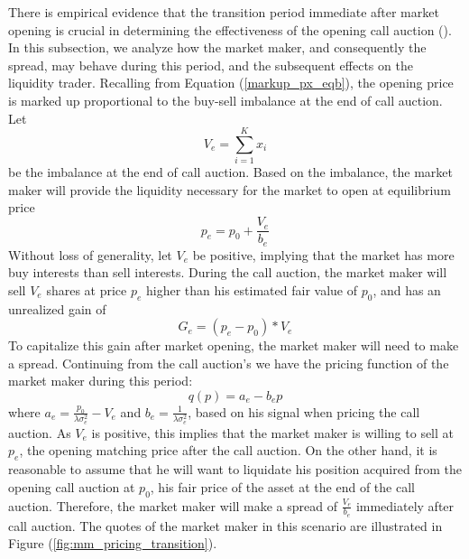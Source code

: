 There is empirical evidence that the transition period immediate after market opening is crucial in determining the effectiveness of the opening call auction (\cite{Pagano2013}). In this subsection, we analyze how the market maker, and consequently the spread, may behave during this period, and the subsequent effects on the liquidity trader. Recalling from Equation (\ref{markup_px_eqb}), the opening price is marked up proportional to the buy-sell imbalance at the end of call auction. Let
\[
  V_e = \sum_{i=1}^K x_i
\]
be the imbalance at the end of call auction. Based on the imbalance, the market maker will provide the liquidity necessary for the market to open at equilibrium price
\[
  p_e = p_0 + \frac{V_e}{b_e}
\]
Without loss of generality, let $V_e$ be positive, implying that the market has more buy interests than sell interests. During the call auction, the market maker will sell $V_e$ shares at price $p_e$ higher than his estimated fair value of $p_0$, and has an unrealized gain of
\[
  G_e = (p_e - p_0) * V_e
\]
To capitalize this gain after market opening, the market maker will need to make a spread. Continuing from the call auction's we have the pricing function of the market maker during this period:
\[
  q(p) = a_e - b_e p
\]
where $a_e = \frac{p_0}{\lambda \sigma_e^2} - V_e$ and $b_e=\frac{1}{\lambda \sigma_e^2}$, based on his signal when pricing the call auction. As $V_e$ is positive, this implies that the market maker is willing to sell at $p_e$, {\color{red} the opening matching price after the call auction}. On the other hand, it is reasonable to assume that he will want to liquidate his position acquired from the opening call auction at $p_0$, his fair price of the asset at the end of the call auction. Therefore, the market maker will make a spread of $\frac{V_e}{b_e}$ immediately after call auction. The quotes of the market maker {\color{red} in this scenario} are illustrated in Figure (\ref{fig:mm_pricing_transition}).

